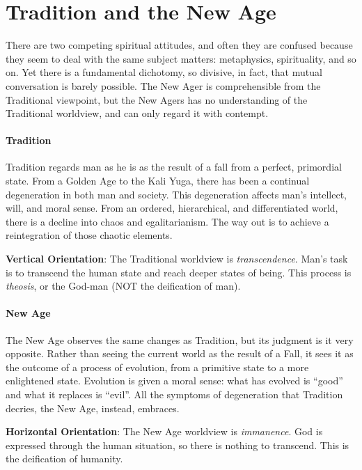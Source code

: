 \section{Tradition and the New Age}

There are two competing spiritual attitudes, and often they are confused because they seem to deal with the same subject
matters: metaphysics, spirituality, and so on. Yet there is a fundamental dichotomy, so divisive, in fact, that mutual
conversation is barely possible. The New Ager is comprehensible from the Traditional viewpoint, but the New Agers has
no understanding of the Traditional worldview, and can only regard it with contempt.

\paragraph{Tradition}
Tradition regards man as he is as the result of a fall from a perfect, primordial state. From a Golden Age to the Kali
Yuga, there has been a continual degeneration in both man and society. This degeneration affects man's
intellect, will, and moral sense. From an ordered, hierarchical, and differentiated world, there is a decline into
chaos and egalitarianism. The way out is to achieve a reintegration of those chaotic elements. 

\textbf{Vertical Orientation}: The Traditional worldview is \emph{transcendence}. Man's task is to transcend
the human state and reach deeper states of being. This process is \emph{theosis}, or the God-man (NOT the deification
of man).

\paragraph{New Age}
The New Age observes the same changes as Tradition, but its judgment is it very opposite. Rather than seeing the current
world as the result of a Fall, it sees it as the outcome of a process of evolution, from a primitive state to a more
enlightened state. Evolution is given a moral sense: what has evolved is “good” and what it replaces is “evil”. All the
symptoms of degeneration that Tradition decries, the New Age, instead, embraces.

\textbf{Horizontal Orientation}: The New Age worldview is \emph{immanence}. God is expressed through the human
situation, so there is nothing to transcend. This is the deification of humanity.


